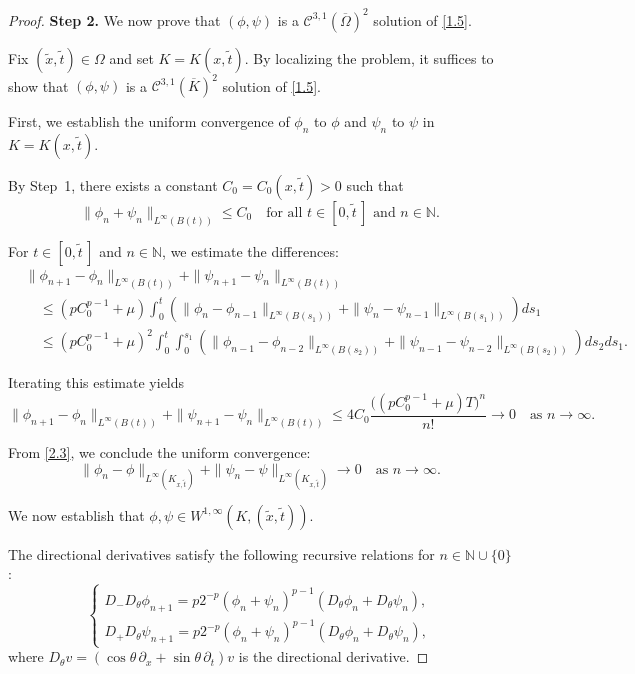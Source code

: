 \documentclass[
  sn-mathphys-num,
  colorlinks,
  linkcolor=darkmagenta,
  citecolor=rufous,
  urlcolor=zaffre,
  hypertexnames=false
]{sn-jnl}
\numberwithin{equation}{section}
\begin{document}
\begin{proof}
   \noindent\textbf{Step 2.} 
We now prove that $(\phi, \psi)$ is a $\mathcal{C}^{3,1}(\overline{\Omega})^2$ solution of \eqref{1.5}.  

Fix $(\tilde{x}, \tilde{t}) \in \Omega$ and set $K = K(x, \tilde{t})$.  
By localizing the problem, it suffices to show that $(\phi, \psi)$ is a $\mathcal{C}^{3,1}(\overline{K})^2$ solution of \eqref{1.5}.  

First, we establish the uniform convergence of $\phi_n$ to $\phi$ and $\psi_n$ to $\psi$ in $K = K(x, \tilde{t})$.  

By Step~1, there exists a constant $C_0 = C_0(x, \tilde{t}) > 0$ such that
\begin{equation}
  \label{eq:2.51}
  \|\phi_n + \psi_n\|_{L^\infty(B(t))} \leq C_0 \quad \text{for all } t \in [0, \tilde{t}\,] \text{ and } n \in \mathbb{N}.
\end{equation}

For $t \in [0, \tilde{t}\,]$ and $n \in \mathbb{N}$, we estimate the differences:
\begin{align*}
&\|\phi_{n+1} - \phi_n\|_{L^\infty(B(t))} + \|\psi_{n+1} - \psi_n\|_{L^\infty(B(t))} \\
&\quad \leq (p C_0^{p-1} + \mu) \int_0^t \left( 
\|\phi_n - \phi_{n-1}\|_{L^\infty(B(s_1))} + \|\psi_n - \psi_{n-1}\|_{L^\infty(B(s_1))} 
\right) ds_1 \\
&\quad \leq (p C_0^{p-1} + \mu)^2 \int_0^t \int_0^{s_1} \left( 
\|\phi_{n-1} - \phi_{n-2}\|_{L^\infty(B(s_2))} + \|\psi_{n-1} - \psi_{n-2}\|_{L^\infty(B(s_2))} 
\right) ds_2 ds_1.
\end{align*}

Iterating this estimate yields
$$
\|\phi_{n+1} - \phi_n\|_{L^\infty(B(t))} + \|\psi_{n+1} - \psi_n\|_{L^\infty(B(t))} 
\leq 4 C_0 \frac{\big((p C_0^{p-1} + \mu) T\big)^n}{n!} \to 0 \quad \text{as } n \to \infty.
$$

From \eqref{2.3}, we conclude the uniform convergence:
$$
\|\phi_n - \phi\|_{L^\infty(K_{x, \tilde{t}})} + \|\psi_n - \psi\|_{L^\infty(K_{x, \tilde{t}})} \to 0 \quad \text{as } n \to \infty.
$$


We now establish that $\phi, \psi \in W^{1,\infty}(K, (\tilde{x}, \tilde{t}))$. 

The directional derivatives satisfy the following recursive relations for $n \in \mathbb{N} \cup \{0\}$:
$$
\begin{cases}
D_- D_\theta \phi_{n+1} = p 2^{-p} (\phi_n + \psi_n)^{p-1} (D_\theta \phi_n + D_\theta \psi_n), \\
D_+ D_\theta \psi_{n+1} = p 2^{-p} (\phi_n + \psi_n)^{p-1} (D_\theta \phi_n + D_\theta \psi_n),
\end{cases}
$$
where $D_\theta v = (\cos \theta \, \partial_x + \sin \theta \, \partial_t)v$ is the directional derivative.


\end{proof}
\end{document}
